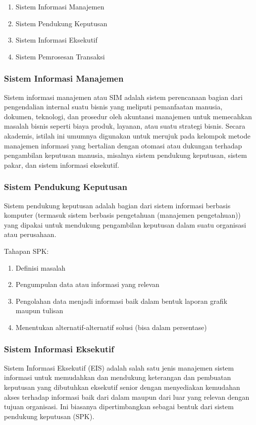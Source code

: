 		\begin{enumerate}
			\item Sistem Informasi Manajemen
			\item Sistem Pendukung Keputusan
			\item Sistem Informasi Eksekutif
			\item Sistem Pemrosesan Transaksi
		\end{enumerate}
		
		\subsubsection{Sistem Informasi Manajemen}
		\label{subsub: SIManajemen}
		Sistem informasi manajemen atau SIM adalah sistem perencanaan bagian dari pengendalian internal suatu bisnis yang meliputi pemanfaatan manusia, dokumen, teknologi, dan prosedur oleh akuntansi manajemen untuk memecahkan masalah bisnis seperti biaya produk, layanan, atau suatu strategi bisnis. Secara akademis, istilah ini umumnya digunakan untuk merujuk pada kelompok metode manajemen informasi yang bertalian dengan otomasi atau dukungan terhadap pengambilan keputusan manusia, misalnya sistem pendukung keputusan, sistem pakar, dan sistem informasi eksekutif.
		
		\subsubsection{Sistem Pendukung Keputusan}
		\label{subsub: sistemPendukungKeputusan}
		Sistem pendukung keputusan adalah bagian dari sistem informasi berbasis komputer (termasuk sistem berbasis pengetahuan (manajemen pengetahuan)) yang dipakai untuk mendukung pengambilan keputusan dalam suatu organisasi atau perusahaan. 
		
		Tahapan SPK:
		\begin{enumerate}
			\item Definisi masalah
			\item Pengumpulan data atau informasi yang relevan
			\item Pengolahan data menjadi informasi baik dalam bentuk laporan grafik maupun tulisan
			\item Menentukan alternatif-alternatif solusi (bisa dalam persentase)
		\end{enumerate}
		
		\subsubsection{Sistem Informasi Eksekutif}
		\label{subsub: SIEksekutif}
		Sistem Informasi Eksekutif (EIS) adalah salah satu jenis manajemen sistem informasi untuk memudahkan dan mendukung keterangan dan pembuatan keputusan yang dibutuhkan eksekutif senior dengan menyediakan kemudahan akses terhadap informasi baik dari dalam maupun dari luar yang relevan dengan tujuan organisasi. Ini biasanya dipertimbangkan sebagai bentuk dari sistem pendukung keputusan (SPK).
		
